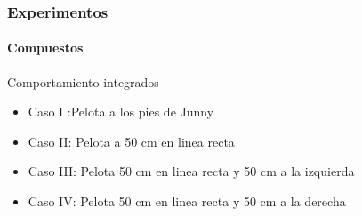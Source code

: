 \documentclass{beamer}
\begin{document}


\begin{frame}
\frametitle{Experimentos}
\framesubtitle{Compuestos}
\begin{block} {Comportamiento integrados}
\begin{itemize}
\item Caso I :Pelota a los pies de Junny
\item Caso II: Pelota a 50 cm en linea recta 
\item Caso III: Pelota 50 cm en linea recta y 50 cm a la izquierda
\item Caso IV: Pelota 50 cm en linea recta y 50 cm a la derecha
\end{itemize}
\end{block}

\begin{figure}[scale = 0.1]
\centering
\end{figure}

\end{frame}
\end{document}
